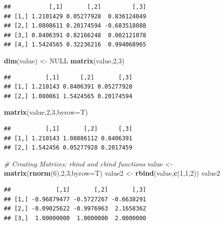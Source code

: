 \documentclass[
]{book}
\newenvironment{Shaded}{\begin{snugshade}}{\end{snugshade}}
\newcommand{\CommentTok}[1]{\textcolor[rgb]{0.56,0.35,0.01}{\textit{#1}}}
\newcommand{\DataTypeTok}[1]{\textcolor[rgb]{0.13,0.29,0.53}{#1}}
\newcommand{\DecValTok}[1]{\textcolor[rgb]{0.00,0.00,0.81}{#1}}
\newcommand{\KeywordTok}[1]{\textcolor[rgb]{0.13,0.29,0.53}{\textbf{#1}}}
\newcommand{\NormalTok}[1]{#1}
\newcommand{\OtherTok}[1]{\textcolor[rgb]{0.56,0.35,0.01}{#1}}
\newcommand{\StringTok}[1]{\textcolor[rgb]{0.31,0.60,0.02}{#1}}
\begin{document}
\begin{verbatim}
##           [,1]       [,2]         [,3]
## [1,] 1.2101429 0.05277928  0.836124049
## [2,] 1.0808611 0.20174594 -0.683518088
## [3,] 0.8406391 0.82166248  0.002121078
## [4,] 1.5424565 0.32236216  0.994068965
\end{verbatim}

\begin{Shaded}
\begin{Highlighting}[]
\KeywordTok{dim}\NormalTok{(value) <-}\StringTok{ }\OtherTok{NULL}
\KeywordTok{matrix}\NormalTok{(value,}\DecValTok{2}\NormalTok{,}\DecValTok{3}\NormalTok{)}
\end{Highlighting}
\end{Shaded}

\begin{verbatim}
##          [,1]      [,2]       [,3]
## [1,] 1.210143 0.8406391 0.05277928
## [2,] 1.080861 1.5424565 0.20174594
\end{verbatim}

\begin{Shaded}
\begin{Highlighting}[]
\KeywordTok{matrix}\NormalTok{(value,}\DecValTok{2}\NormalTok{,}\DecValTok{3}\NormalTok{,}\DataTypeTok{byrow=}\NormalTok{T)}
\end{Highlighting}
\end{Shaded}

\begin{verbatim}
##          [,1]       [,2]      [,3]
## [1,] 1.210143 1.08086112 0.8406391
## [2,] 1.542456 0.05277928 0.2017459
\end{verbatim}

\begin{Shaded}
\begin{Highlighting}[]
\CommentTok{# Creating Matrices: rbind and cbind functions}
\NormalTok{value <-}\StringTok{ }\KeywordTok{matrix}\NormalTok{(}\KeywordTok{rnorm}\NormalTok{(}\DecValTok{6}\NormalTok{),}\DecValTok{2}\NormalTok{,}\DecValTok{3}\NormalTok{,}\DataTypeTok{byrow=}\NormalTok{T)}
\NormalTok{value2 <-}\StringTok{ }\KeywordTok{rbind}\NormalTok{(value,}\KeywordTok{c}\NormalTok{(}\DecValTok{1}\NormalTok{,}\DecValTok{1}\NormalTok{,}\DecValTok{2}\NormalTok{))}
\NormalTok{value2}
\end{Highlighting}
\end{Shaded}

\begin{verbatim}
##             [,1]       [,2]       [,3]
## [1,] -0.96879477 -0.5727267 -0.6638291
## [2,] -0.09025622 -0.9976963  2.1658362
## [3,]  1.00000000  1.0000000  2.0000000
\end{verbatim}
\end{document}
